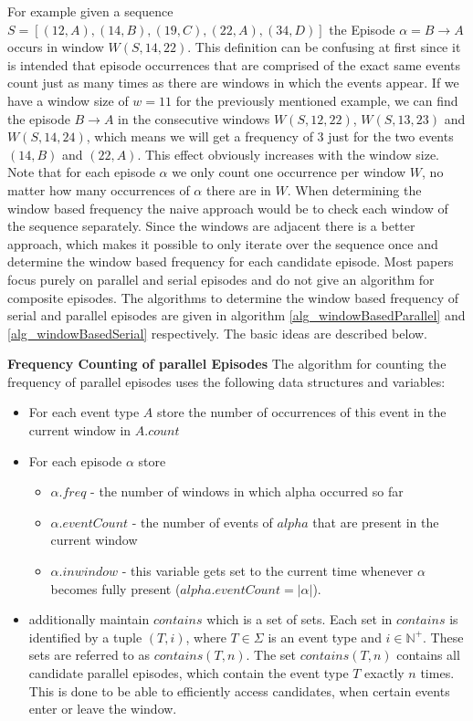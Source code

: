 For example given a sequence $S = [ (12,A) , (14,B) , (19,C) , (22,A), (34,D) ]$ the Episode $\alpha = B \rightarrow A$ occurs in window $W(S,14,22)$. \newline 
This definition can be confusing at first since it is intended that episode occurrences that are comprised of the exact same events count just as many times as there are windows in which the events appear. If we have a window size of $w=11$ for the previously mentioned example, we can find the episode $B \rightarrow A$ in the consecutive windows $W(S,12,22)$, $W(S,13,23)$ and $W(S,14,24)$, which means we will get a frequency of $3$ just for the two events $(14,B)$ and $(22,A)$. This effect obviously increases with the window size. Note that for each episode $\alpha$ we only count one occurrence per window $W$, no matter how many occurrences of $\alpha$ there are in $W$.\newline
When determining the window based frequency the naive approach would be to check each window of the sequence separately. Since the windows are adjacent there is a better approach, which makes it possible to only iterate over the sequence once and determine the window based frequency for each candidate episode. Most papers focus purely on parallel and serial episodes and do not give an algorithm for composite episodes. The algorithms to determine the window based frequency of serial and parallel episodes are given in algorithm \ref{alg_windowBasedParallel} and \ref{alg_windowBasedSerial} respectively. The basic ideas are described below. \newline \newline

\textbf{Frequency Counting of parallel Episodes} \newline
The algorithm for counting the frequency of parallel episodes uses the following data structures and variables:

\begin{itemize}
	\item For each event type $A$ store the number of occurrences of this event in the current window in $A.count$
	\item For each episode $\alpha$ store 
	\begin{itemize}
		\item $\alpha .freq$ - the number of windows in which alpha occurred so far
		\item $\alpha. eventCount$ - the number of events of $alpha$ that are present in the current window
		\item $\alpha. inwindow$ - this variable gets set to the current time whenever $\alpha$ becomes fully present ($alpha .eventCount = |\alpha |$).
	\end{itemize}
	\item additionally maintain $contains$ which is a set of sets. Each set in $contains$ is identified by a tuple $(T,i)$, where $T \in \Sigma$ is an event type and $i \in \mathbb{N}^+$. These sets are referred to as $contains(T,n)$. The set $contains(T,n)$ contains all candidate parallel episodes, which contain the event type $T$ exactly $n$ times. This is done to be able to efficiently access candidates, when certain events enter or leave the window.
\end{itemize}

